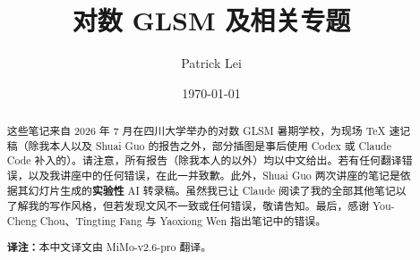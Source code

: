 \documentclass{amsart}
\title{对数 GLSM 及相关专题}
\author{Patrick Lei}
\date{\today}
\theoremstyle{definition}
\theoremstyle{remark}
\theoremstyle{plain}
\theoremstyle{definition}
\theoremstyle{remark}
\newcommand{\1}{\mathbf{1}}
\newcommand{\2}{\mathbf{2}}
\newcommand{\3}{\mathbf{3}}
\begin{document}
    
\begin{abstract}
    这些笔记来自 2026 年 7 月在四川大学举办的对数 GLSM 暑期学校，为现场 TeX 速记稿（除我本人以及 Shuai Guo 的报告之外，部分插图是事后使用 Codex 或 Claude Code 补入的）。请注意，所有报告（除我本人的以外）均以中文给出。若有任何翻译错误，以及我讲座中的任何错误，在此一并致歉。此外，Shuai Guo 两次讲座的笔记是依据其幻灯片生成的\textbf{实验性} AI 转录稿。虽然我已让 Claude 阅读了我的全部其他笔记以了解我的写作风格，但若发现文风不一致或任何错误，敬请告知。最后，感谢 You-Cheng Chou、Tingting Fang 与 Yaoxiong Wen 指出笔记中的错误。

    \medskip
    \noindent\textbf{译注：}本中文译文由 MiMo-v2.6-pro 翻译。
\end{abstract}

\maketitle

\tableofcontents
\end{document}
